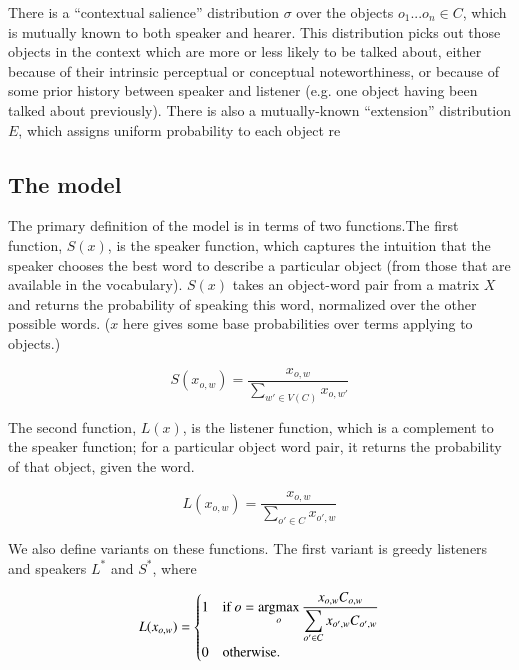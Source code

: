 \documentclass[man,noapacite]{apa2}
\newcommand{\argmax}{\operatornamewithlimits{argmax}}
\begin{document}
There is a ``contextual salience'' distribution $\sigma$ over the objects ${o_1 ... o_n} \in C$, which is mutually known to both speaker and hearer. This distribution picks out those objects in the context which are more or less likely to be talked about, either because of their intrinsic perceptual or conceptual noteworthiness, or because of some prior history between speaker and listener (e.g. one object having been talked about previously). There is also a mutually-known ``extension'' distribution $E$, which assigns uniform probability to each object re

\subsection{The model}

The primary definition of the model is in terms of two functions.The first function, $S(x)$, is the speaker function, which captures the intuition that the speaker chooses the best word to describe a particular object (from those that are available in the vocabulary). $S(x)$ takes an object-word pair from a matrix $X$ and returns the probability of speaking this word, normalized over the other possible words. ($x$ here gives some base probabilities over terms applying to objects.)

\begin{equation}
S(x_{o,w}) = \frac{x_{o,w}}{\displaystyle \sum_{w' \in V(C)} x_{o,w'}}
\end{equation}

The second function, $L(x)$, is the listener function, which is a complement to the speaker function; for a particular object word pair, it returns the probability of that object, given the word. 

\begin{equation}
L(x_{o,w}) = \frac{x_{o,w}}{\displaystyle\sum_{o' \in C} x_{o',w} } %
\end{equation}

We also define variants on these functions. The first variant is greedy listeners and speakers $L^*$ and $S^*$, where

\begin{equation}
L(x_{o,w}) = 
\begin{cases}
1 & \mbox{if } o = \displaystyle \argmax_{o} \frac{x_{o,w} C_{o,w}}{\displaystyle\sum_{o' \in C} x_{o',w} C_{o',w}} \\
0 & \mbox{otherwise}.
\end{cases}
\end{equation}
\end{document}
